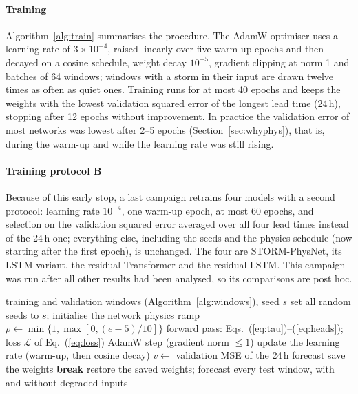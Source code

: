 \documentclass[a4paper,fleqn]{cas-dc}
\begin{document}
\paragraph{Training} Algorithm~\ref{alg:train} summarises the procedure. The AdamW optimiser \citep{loshchilov2019}
uses a learning rate of \(3\times10^{-4}\), raised linearly over five warm-up epochs and then decayed on a cosine
schedule, weight decay \(10^{-5}\),
gradient clipping at norm 1 and batches of 64 windows; windows with a storm in their input are drawn twelve times
as often as quiet ones. Training runs for at most 40 epochs and keeps the weights with the lowest validation
squared error of the longest lead time (24\,h), stopping after 12 epochs without improvement. In practice the
validation error of most networks was lowest after 2--5 epochs (Section~\ref{sec:whyphys}), that is, during the
warm-up and while the learning rate was still rising.

\paragraph{Training protocol B}\label{sec:protB} Because of this early stop, a last campaign retrains four models with a second
protocol: learning rate \(10^{-4}\), one warm-up epoch, at most 60 epochs, and selection on the validation squared
error averaged over all four lead times instead of the 24\,h one; everything else, including the seeds and the
physics schedule (now starting after the first epoch), is unchanged. The four are STORM-PhysNet, its LSTM variant,
the residual Transformer and the residual LSTM. This campaign was run after all other results had been analysed, so
its comparisons are post hoc.

\begin{algorithm}[!t]
\caption{Training one model for one test block and seed}
\label{alg:train}
\begin{algorithmic}[1]
\Require training and validation windows (Algorithm~\ref{alg:windows}), seed \(s\)
\State set all random seeds to \(s\); initialise the network
  \State physics ramp \(\rho\gets\min\{1,\max[0,(e-5)/10]\}\)
    \State forward pass: Eqs.~(\ref{eq:tau})--(\ref{eq:heads}); loss \(\mathcal L\) of Eq.~(\ref{eq:loss})
    \State AdamW step (gradient norm \(\le1\))
  \EndFor
  \State update the learning rate (warm-up, then cosine decay)
  \State \(v\gets\) validation MSE of the 24\,h forecast
   save the weights  \textbf{break} \EndIf
\EndFor
\State restore the saved weights; forecast every test window, with and without degraded inputs
\end{algorithmic}
\end{algorithm}
\end{document}
